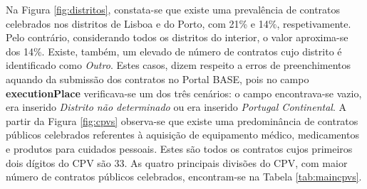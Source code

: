 



\begin{table}[H]
	\centering
	\renewcommand{\arraystretch}{1.35}
	\setlength{\tabcolsep}{20pt}
	\caption{Descrição das principais divisões de CPV.}
	\label{tab:maincpvs}
\end{table}

Na Figura \ref{fig:distritos}, constata-se que existe uma prevalência de contratos celebrados nos distritos de Lisboa e do Porto, com 21\% e 14\%, respetivamente. Pelo contrário, considerando todos os distritos do interior, o valor aproxima-se dos 14\%. Existe, também, um elevado de número de contratos cujo distrito é identificado como \textit{Outro}. Estes casos, dizem respeito a erros de preenchimentos aquando da submissão dos contratos no Portal BASE, pois no campo \textbf{executionPlace} verificava-se um dos três cenários: o campo encontrava-se vazio, era inserido \textit{Distrito não determinado} ou era inserido \textit{Portugal Continental}. A partir da Figura \ref{fig:cpvs} observa-se que existe uma predominância de contratos públicos celebrados referentes à aquisição de equipamento médico, medicamentos e produtos para cuidados pessoais. Estes são todos os contratos cujos primeiros dois dígitos do CPV são 33. As quatro principais divisões do CPV, com maior número de contratos públicos celebrados, encontram-se na Tabela \ref{tab:maincpvs}. 

